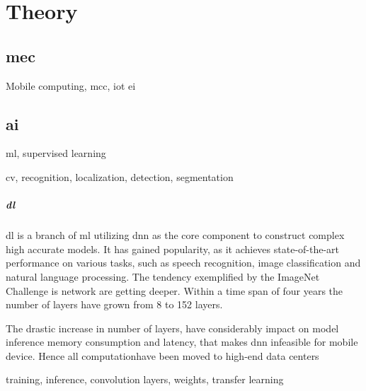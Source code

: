 \chapter{Theory}

\section{\gls{mec}}

Mobile computing, \gls{mcc}, \gls{iot} \gls{ei}

\section{\gls{ai}}

\gls{ml}, supervised learning

\gls{cv}, recognition, localization, detection, segmentation

\paragraph{\gls{dl}} 

\gls{dl} is a branch of \gls{ml} utilizing \gls{dnn} as the core component to construct complex high accurate models. It has gained popularity, as it achieves state-of-the-art performance on various tasks, such as speech recognition, image classification and natural language processing. The tendency exemplified by the ImageNet Challenge \cite{russakovsky_imagenet_2015} is network are getting deeper. Within a time span of four years the number of layers have grown from 8 to 152 layers. 

The drastic increase in number of layers, have considerably impact on model inference memory consumption and latency, that makes \gls{dnn} infeasible for mobile device. Hence all computationhave been moved to high-end data centers

training, inference, convolution layers, weights, transfer learning 

